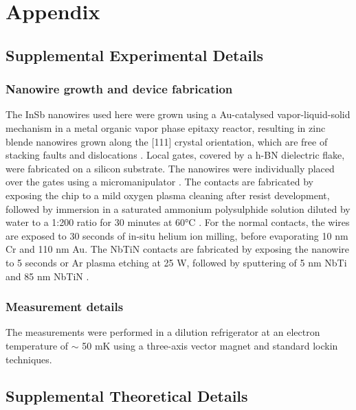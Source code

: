 \section{Appendix}

\subsection{Supplemental Experimental Details}
\subsubsection{Nanowire growth and device fabrication}
The \mbox{InSb} nanowires used here were grown using a Au-catalysed vapor-liquid-solid mechanism in a metal organic vapor phase epitaxy reactor, resulting in zinc blende nanowires grown \mbox{along} the [111] crystal orientation, which are free of stacking \mbox{faults} and dislocations \cite{Car2014}. Local gates, covered by a h-BN dielectric flake, were fabricated on a silicon substrate. The nanowires were individually placed over the gates using a micromanipulator \cite{Flohr2011}. The contacts are fabricated by exposing the chip to a mild oxygen plasma cleaning after resist development, followed by immersion in a saturated ammonium polysulphide solution diluted by water to a 1:200 ratio for 30 minutes at \ang{60}C \cite{Suyatin2007}. For the normal contacts, the wires are exposed to 30 seconds of in-situ helium ion milling, before evaporating 10 nm Cr and 110 nm Au. The NbTiN contacts are fabricated by exposing the nanowire to 5 seconds or Ar plasma etching at 25 W, followed by sputtering of 5 nm NbTi and 85 nm NbTiN \cite{HardGap,BalSc}.

\subsubsection{Measurement details}
The measurements were performed in a dilution refrigerator at an electron temperature of $\sim$ 50 mK  using a three-axis vector magnet and standard lockin techniques.

\subsection{Supplemental Theoretical Details}
